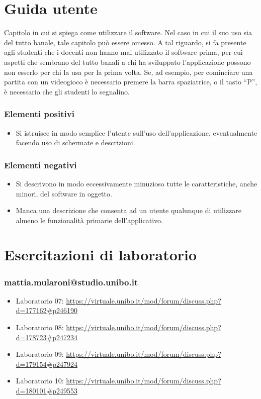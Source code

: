 \documentclass[a4paper,12pt]{report}
\begin{document}
\chapter{Guida utente}

Capitolo in cui si spiega come utilizzare il software. Nel caso in cui il suo uso sia del tutto
banale, tale capitolo può essere omesso.
%
A tal riguardo, si fa presente agli studenti che i docenti non hanno mai utilizzato il software
prima, per cui aspetti che sembrano del tutto banali a chi ha sviluppato l'applicazione possono non
esserlo per chi la usa per la prima volta.
%
Se, ad esempio, per cominciare una partita con un videogioco è necessario premere la barra
spaziatrice, o il tasto ``P'', è necessario che gli studenti lo segnalino.

\subsection*{Elementi positivi}

\begin{itemize}
 \item Si istruisce in modo semplice l'utente sull'uso dell'applicazione, eventualmente facendo uso di schermate e descrizioni.
\end{itemize}

\subsection*{Elementi negativi}
\begin{itemize}
 \item Si descrivono in modo eccessivamente minuzioso tutte le caratteristiche, anche minori, del software in oggetto.
 \item Manca una descrizione che consenta ad un utente qualunque di utilizzare almeno le funzionalità primarie dell'applicativo.
\end{itemize}

\chapter{Esercitazioni di laboratorio}

\subsection{mattia.mularoni@studio.unibo.it}

\begin{itemize}
\item Laboratorio 07: \url{https://virtuale.unibo.it/mod/forum/discuss.php?d=177162#p246190}
 \item Laboratorio 08: \url{https://virtuale.unibo.it/mod/forum/discuss.php?d=178723#p247234}
 \item Laboratorio 09: \url{https://virtuale.unibo.it/mod/forum/discuss.php?d=179154#p247924}
 \item Laboratorio 10: \url{https://virtuale.unibo.it/mod/forum/discuss.php?d=180101#p249553}
\end{itemize}




\end{document}
